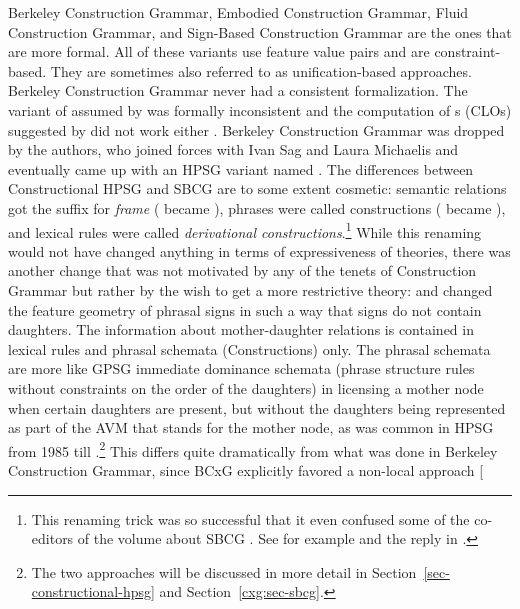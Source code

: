 \documentclass[output=paper
	        ,collection
	        ,collectionchapter
 	        ,biblatex
                ,babelshorthands
                ,newtxmath
                ,draftmode
                ,colorlinks, citecolor=brown
]{langscibook}
\begin{document}
Berkeley Construction Grammar, Embodied Construction Grammar, Fluid Construction Grammar, and
Sign-Based Construction Grammar are the ones that are more formal. All of these variants use feature
value pairs and are constraint-based. They are sometimes also referred to as unification-based
approaches. Berkeley Construction Grammar never had a consistent formalization. The variant of
 assumed by \citet{KF99a} was formally inconsistent \citep[Section~2.4]{Mueller2006d} and the computation of s (CLOs) suggested  by \citet{Kay2002a} did not work either \citep[Section~3]{Mueller2006d}. Berkeley Construction
Grammar was dropped by the authors, who joined forces with Ivan Sag and Laura Michaelis and eventually
came up with an HPSG variant named \sbcg{} \citep{Sag2012a}. The differences between
Constructional HPSG \citep{Sag97a} and SBCG are to some extent cosmetic: semantic relations got the
suffix  for \emph{frame} ( became ), phrases were called constructions ( became
), and lexical rules were called \emph{derivational constructions}.\footnote{
This renaming trick was so successful that it even confused some of the co-editors of the volume about
SBCG \citep{BS2012a-ed}. See for example  and the reply in .
}
While this renaming would not have changed anything in terms of expressiveness of theories, there
was another change that was not motivated by any of the tenets of Construction Grammar but rather by
the wish to get a more restrictive theory: \citet*{SWB2003a} and \citet{Sag2007a} changed the feature geometry of phrasal
signs in such a way that signs do not contain daughters. The information about mother-daughter relations
is contained in lexical rules and phrasal schemata (Constructions) only. The phrasal schemata are
more like GPSG immediate dominance schemata (phrase structure rules without constraints on the order of the daughters) in licensing a mother node when certain daughters are present,
but without the daughters being represented as part of the AVM that stands for the mother node, as
was common in HPSG from 1985 till .\footnote{%
  The two approaches will be discussed in more detail in Section~\ref{sec-constructional-hpsg} and Section~\ref{cxg:sec-sbcg}.
}
This differs quite dramatically from what was done in Berkeley Construction
Grammar, since BCxG explicitly favored a non-local approach \parencites[]{Fillmore88a}[\page
\end{document}
